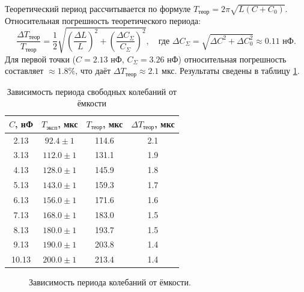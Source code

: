 \documentclass[a4paper,12pt]{extarticle}
\begin{document}
Теоретический период рассчитывается по формуле $T_{\text{теор}} = 2\pi\sqrt{L(C + C_0)}$. Относительная погрешность теоретического периода:
\begin{equation*}
    \frac{\Delta T_{\text{теор}}}{T_{\text{теор}}} = \frac{1}{2}\sqrt{\left(\frac{\Delta L}{L}\right)^2 + \left(\frac{\Delta C_\Sigma}{C_\Sigma}\right)^2}, \quad \text{где } \Delta C_\Sigma = \sqrt{\Delta C^2 + \Delta C_0^2} \approx 0.11 \text{ нФ}.
\end{equation*}
Для первой точки ($C = 2.13$ нФ, $C_\Sigma = 3.26$ нФ) относительная погрешность составляет $\approx 1.8\%$, что даёт $\Delta T_{\text{теор}} \approx 2.1$ мкс. Результаты сведены в таблицу \ref{tab:period}.

\begin{table}[H]
    \centering
    \caption{Зависимость периода свободных колебаний от ёмкости}
    \label{tab:period}
    \begin{tabular}{cccc}
        \toprule
        $C$, нФ & $T_{\text{эксп}}$, мкс & $T_{\text{теор}}$, мкс & $\Delta T_{\text{теор}}$, мкс \\
        \midrule
        2.13 & $92.4 \pm 1$ & 114.6 & 2.1 \\
        3.13 & $112.0 \pm 1$ & 131.1 & 1.9 \\
        4.13 & $128.0 \pm 1$ & 145.9 & 1.8 \\
        5.13 & $143.0 \pm 1$ & 159.3 & 1.7 \\
        6.13 & $156.0 \pm 1$ & 171.6 & 1.6 \\
        7.13 & $168.0 \pm 1$ & 183.0 & 1.5 \\
        8.13 & $180.0 \pm 1$ & 193.7 & 1.5 \\
        9.13 & $190.0 \pm 1$ & 203.8 & 1.4 \\
        10.13 & $200.0 \pm 1$ & 213.4 & 1.4 \\
        \bottomrule
    \end{tabular}
\end{table}

\begin{figure}[H]
    \centering
    \caption{Зависимость периода колебаний от ёмкости.}
    \label{fig:T_vs_C}
\end{figure}
\end{document}
